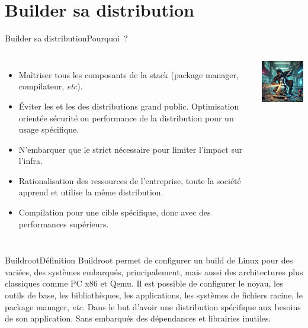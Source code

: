 \documentclass{beamer}
\begin{document}
    \section{Builder sa distribution}\label{sec:build-distribution}
    \begin{frame}{Builder sa distribution}{Pourquoi~?}
        \begin{columns}
            \begin{itemize}
                \item Maîtriser tous les composants de la stack (package manager, compilateur, \textit{etc}).
                \item Éviter les  et les  des distributions grand public.
                Optimisation orientée sécurité ou performance de la distribution pour un usage spécifique.
                \item N'embarquer que le strict nécessaire pour limiter l'impact sur l'infra.
                \item Rationalisation des ressources de l'entreprise, toute la société apprend et utilise la même distribution.
                \item Compilation pour une cible spécifique, donc avec des performances supérieurs.
            \end{itemize}
            \centering
            \includegraphics[width=4cm]{image/building-linux}
        \end{columns}
    \end{frame}

    \begin{frame}{Buildroot}{Définition}
        Buildroot permet de configurer un build de Linux pour des  variées, des systèmes embarqués, principalement, mais aussi des architectures plus classiques comme PC x86 et Qemu.
        \bigbreak
        Il est possible de configurer le noyau, les outils de base, les bibliothèques, les applications, les systèmes de fichiers racine, le package manager, \textit{etc}.
        Dans le but d'avoir une distribution spécifique aux besoins de son application.
        Sans embarqués des dépendances et librairies inutiles.
    \end{frame}
\end{document}
